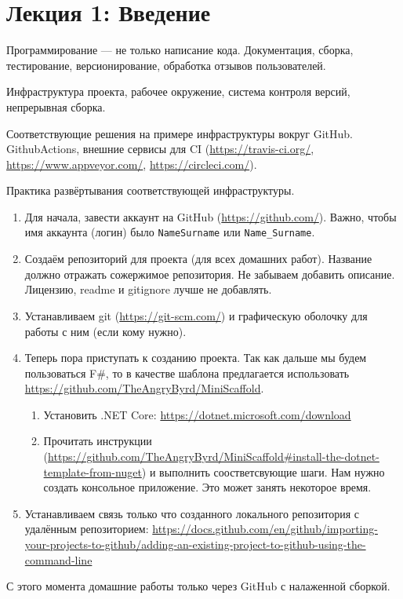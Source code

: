 \section{Лекция 1: Введение}

Программирование --- не только написание кода.
Документация, сборка, тестирование, версионирование, обработка отзывов пользователей.

Инфраструктура проекта, рабочее окружение, система контроля версий, непрерывная сборка.

Соответствующие решения на примере инфраструктуры вокруг GitHub. GithubActions, внешние сервисы для CI (\url{https://travis-ci.org/}, \url{https://www.appveyor.com/}, \url{https://circleci.com/}). 

Практика развёртывания соответствующей инфраструктуры. 
\begin{enumerate}
  \item Для начала, завести аккаунт на GitHub (\url{https://github.com/}). 
Важно, чтобы имя аккаунта (логин) было \texttt{NameSurname} или \texttt{Name\_Surname}.
   
  \item Создаём репозиторий для проекта (для всех домашних работ). Название должно отражать сожержимое репозитория. Не забываем добавить описание. Лицензию, readme и gitignore лучше не добавлять.
  \item Устанавливаем git (\url{https://git-scm.com/}) и графическую оболочку для работы с ним (если кому нужно).
  \item Теперь пора приступать к созданию проекта.
Так как дальше мы будем пользоваться F\#, то в качестве шаблона предлагается использовать \url{https://github.com/TheAngryByrd/MiniScaffold}. 
\begin{enumerate}
  \item Установить .NET Core: \url{https://dotnet.microsoft.com/download}
  \item Прочитать инструкции (\href{https://github.com/TheAngryByrd/MiniScaffold#install-the-dotnet-template-from-nuget}{https://github.com/TheAngryByrd/MiniScaffold\#install-the-dotnet-template-from-nuget}) и выполнить соостветсвующие шаги. Нам нужно создать консольное приложение. Это может занять некоторое время.
\end{enumerate}
\item Устанавливаем связь только что созданного локального репозитория с удалённым репозиторием: \href{https://docs.github.com/en/github/importing-your-projects-to-github/adding-an-existing-project-to-github-using-the-command-line}{https://docs.github.com/en/github/importing-your-projects-to-github/adding-an-existing-project-to-github-using-the-command-line}

\end{enumerate}

С этого момента домашние работы только через GitHub с налаженной сборкой.